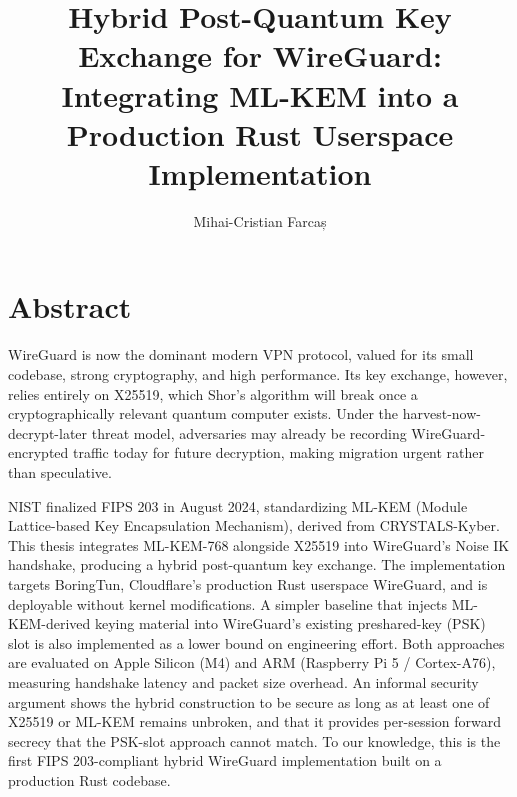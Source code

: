 \documentclass[12pt,a4paper,oneside]{report}
\begin{document}
\title{Hybrid Post-Quantum Key Exchange for WireGuard: Integrating ML-KEM into a Production Rust Userspace Implementation}   
\author{Mihai-Cristian Farcaș}

\maketitle

\maketitleromanian

\newpage
\thispagestyle{empty}
\mbox{}
\newpage

\setcounter{page}{1}

\chapter*{Abstract}

WireGuard is now the dominant modern VPN protocol, valued for its small codebase, strong cryptography, and high performance. Its key exchange, however, relies entirely on X25519, which Shor's algorithm will break once a cryptographically relevant quantum computer exists. Under the harvest-now-decrypt-later threat model, adversaries may already be recording WireGuard-encrypted traffic today for future decryption, making migration urgent rather than speculative.

\vspace{0.5cm}

NIST finalized FIPS 203 in August 2024, standardizing ML-KEM (Module Lattice-based Key Encapsulation Mechanism), derived from CRYSTALS-Kyber. This thesis integrates ML-KEM-768 alongside X25519 into WireGuard's Noise IK handshake, producing a hybrid post-quantum key exchange. The implementation targets BoringTun, Cloudflare's production Rust userspace WireGuard, and is deployable without kernel modifications. A simpler baseline that injects ML-KEM-derived keying material into WireGuard's existing preshared-key (PSK) slot is also implemented as a lower bound on engineering effort. Both approaches are evaluated on Apple Silicon (M4) and ARM (Raspberry Pi 5 / Cortex-A76), measuring handshake latency and packet size overhead. An informal security argument shows the hybrid construction to be secure as long as at least one of X25519 or ML-KEM remains unbroken, and that it provides per-session forward secrecy that the PSK-slot approach cannot match. To our knowledge, this is the first FIPS 203-compliant hybrid WireGuard implementation built on a production Rust codebase.
\end{document}

